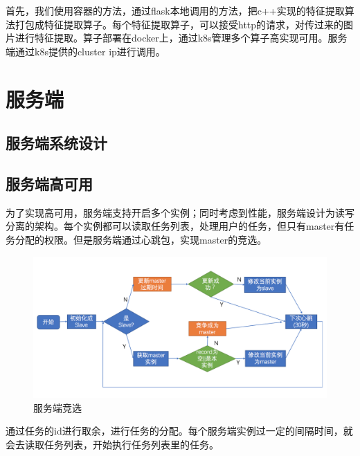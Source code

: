 首先，我们使用容器的方法，通过flask本地调用的方法，把c++实现的特征提取算法打包成特征提取算子。每个特征提取算子，可以接受http的请求，对传过来的图片进行特征提取。算子部署在docker上，通过k8s管理多个算子高实现可用。服务端通过k8s提供的cluster ip进行调用。


\section{服务端}
\subsection{服务端系统设计}



\subsection{服务端高可用}
为了实现高可用，服务端支持开启多个实例；同时考虑到性能，服务端设计为读写分离的架构。每个实例都可以读取任务列表，处理用户的任务，但只有master有任务分配的权限。但是服务端通过心跳包，实现master的竞选。
\begin{figure}
    \centering
    \includegraphics[width=12cm]{images/slave-master.png}
    \caption{服务端竞选}
    \label{fig:my_label}
\end{figure}
通过任务的id进行取余，进行任务的分配。每个服务端实例过一定的间隔时间，就会去读取任务列表，开始执行任务列表里的任务。

